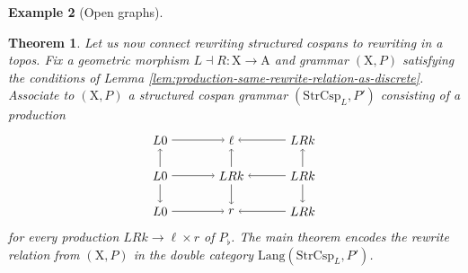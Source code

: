 \documentclass{amsart}
\newcommand{\A}{\cat{A}}
\newcommand{\X}{\cat{X}}
\newcommand{\StrCsp}{\cat{StrCsp}}
\newcommand{\Lang}{\mathrm{Lang}}
\newcommand{\cat}[1]{\mathrm{#1}}
\newcommand{\from}{\colon}
\newtheorem{theorem}{Theorem}[section]
\theoremstyle{remark}
\theoremstyle{definition}
\newtheorem{example}[theorem]{Example}
\begin{document}
\begin{example}[Open graphs]
{{\begin{theorem}
Let us now connect rewriting structured cospans to rewriting in a
topos. Fix a geometric morphism $ L \dashv R \from \X \to \A $ and
grammar $ ( \X , P ) $ satisfying the conditions of Lemma
\ref{lem:production-same-rewrite-relation-as-discrete}.  Associate to
$ ( \X , P ) $ a structured cospan grammar $ ( \StrCsp_L , P' ) $
consisting of a production
%
\[
  \begin{tikzpicture}
    \node (1) at (0,2) {$ L 0 $};
    \node (2) at (2,2) {$ \ell $};
    \node (3) at (4,2) {$ LRk $};
    \node (4) at (0,1) {$ L 0 $};
    \node (5) at (2,1) {$ LRk $};
    \node (6) at (4,1) {$ LRk $};
    \node (7) at (0,0) {$ L 0 $};
    \node (8) at (2,0) {$ r $};
    \node (9) at (4,0) {$ LRk $};
    \draw [->] (1) to node [] {\scriptsize{$  $}} (2);
    \draw [->] (3) to node [] {\scriptsize{$  $}} (2);
    \draw [->] (4) to node [] {\scriptsize{$  $}} (5);
    \draw [->] (6) to node [] {\scriptsize{$  $}} (5);
    \draw [->] (7) to node [] {\scriptsize{$  $}} (8);
    \draw [->] (9) to node [] {\scriptsize{$  $}} (8);
    \draw [->] (4) to node [] {\scriptsize{$  $}} (1);
    \draw [->] (4) to node [] {\scriptsize{$  $}} (7);
    \draw [->] (5) to node [] {\scriptsize{$  $}} (2);
    \draw [->] (5) to node [] {\scriptsize{$  $}} (8);
    \draw [->] (6) to node [] {\scriptsize{$  $}} (3);
    \draw [->] (6) to node [] {\scriptsize{$  $}} (9);
  \end{tikzpicture}
\]
% 
for every production $ LRk \to \ell \times r $ of $ P_{\flat} $. The
main theorem encodes the rewrite relation from $ ( \X , P ) $ in the
double category $ \Lang ( \StrCsp_L , P' ) $.


\end{theorem}}}
\end{example}
\end{document}
